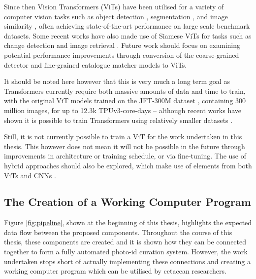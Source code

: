 Since then Vision Transformers (ViTs) have been utilised for a variety of computer vision tasks such as object detection \cite{zhang_dino_2022, fang_you_2021, li_exploring_2022}, segmentation \cite{hu_istr_2021, prangemeier_attention-based_2020, wang_end--end_2021, kirillov_segment_2023}, and image similarity \cite{el-nouby_training_2021}, often achieving state-of-the-art performance on large scale benchmark datasets. Some recent works have also made use of Siamese ViTs for tasks such as change detection \cite{bandara_transformer-based_2022} and image retrieval \cite{shabanov_stir_2023}. Future work should focus on examining potential performance improvements through conversion of the coarse-grained detector and fine-grained catalogue matcher models to ViTs. 

It should be noted here however that this is very much a long term goal as Transformers currently require both massive amounts of data and time to train, with the original ViT models trained on the JFT-300M dataset \cite{sun_revisiting_2017}, containing 300 million images, for up to 12.3k TPUv3-core-days -- although recent works have shown it is possible to train Transformers using relatively smaller datasets \cite{bennour_bat_2022}. 

Still, it is not currently possible to train a ViT for the work undertaken in this thesis. This however does not mean it will not be possible in the future through improvements in architecture or training schedule, or via fine-tuning. The use of hybrid approaches should also be explored, which make use of elements from both ViTs and CNNs \cite{liu_convnet_2022, liu_swin_2021}.

\subsection{The Creation of a Working Computer Program}\label{ch:Conclusion,sec:FutureWork,sub:GUI}

Figure \ref{fig:pipeline}, shown at the beginning of this thesis, highlights the expected data flow between the proposed components. Throughout the course of this thesis, these components are created and it is shown how they can be connected together to form a fully automated photo-id curation system. However, the work undertaken stops short of actually implementing these connections and creating a working computer program which can be utilised by cetacean researchers. 

